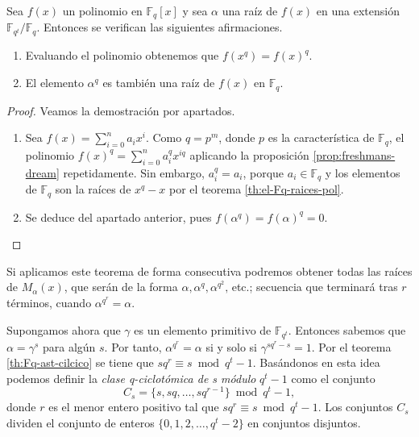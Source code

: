 \begin{theorem}
  Sea \(f(x)\) un polinomio en \(\mathbb F_q[x]\) y sea \(\alpha\) una raíz de \(f(x)\) en una extensión \(\mathbb F_{q^t}/\mathbb F_q\).
  Entonces se verifican las siguientes afirmaciones.
  \begin{enumerate}
    \item Evaluando el polinomio obtenemos que \(f(x^q) = f(x)^q\).
    \item El elemento \(\alpha^q\) es también una raíz de \(f(x)\) en \(\mathbb F_q\).
  \end{enumerate}
\end{theorem}

\begin{proof}
  Veamos la demostración por apartados.
  \begin{enumerate}
    \item Sea \(f(x) = \sum_{i=0}^{n}a_ix^{i}\).
    Como \(q = p^{m}\), donde \(p\) es la característica de \(\mathbb F_q\), el polinomio \(f(x)^{q} = \sum_{i=0}^{n}a_{i}^{q}x^{iq}\) aplicando la proposición \ref{prop:freshmans-dream} repetidamente.
    Sin embargo, \(a_{i}^{q} = a_i\), porque \(a_i \in \mathbb F_q\) y los elementos de \(\mathbb F_q\) son la raíces de \(x^{q} - x\) por el teorema \ref{th:el-Fq-raices-pol}.
    \item Se deduce del apartado anterior, pues \(f(\alpha^q) = f(\alpha)^q = 0\).\qedhere
  \end{enumerate}
\end{proof}

Si aplicamos este teorema de forma consecutiva podremos obtener todas las raíces de \(M_{\alpha}(x)\), que serán de la forma \(\alpha, \alpha^q, \alpha^{q^2},\)\,etc.; secuencia que terminará tras \(r\) términos, cuando \(\alpha^{q^r} = \alpha\).

Supongamos ahora que \(\gamma\) es un elemento primitivo de \(\mathbb F_{q^t}\).
Entonces sabemos que \(\alpha = \gamma^s\) para algún \(s\).
Por tanto, \(\alpha^{q^r} = \alpha\) si y solo si \(\gamma^{sq^r - s} = 1\).
Por el teorema \ref{th:Fq-ast-cilcico} se tiene que \(sq^r \equiv s \bmod q^t - 1\).
Basándonos en esta idea podemos definir la \textit{clase q-ciclotómica de s módulo} \(q^t - 1\) como el conjunto
\[
  C_s = \{s, sq, \dots, sq^{r-1}\} \bmod q^t - 1, 
\]
donde \(r\) es el menor entero positivo tal que \(sq^r \equiv s \bmod q^t - 1\).
Los conjuntos \(C_s\) dividen el conjunto de enteros \(\{0, 1, 2, \dots, q^t - 2\}\) en conjuntos disjuntos.


